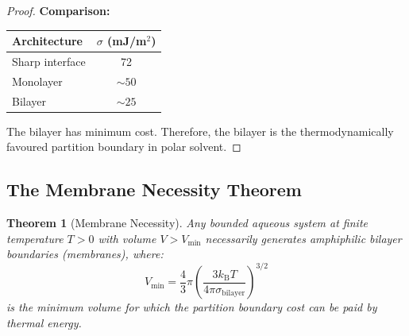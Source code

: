 \documentclass[twocolumn,10pt]{article}
\newtheorem{theorem}{Theorem}[section]
\theoremstyle{remark}
\newcommand{\kB}{k_{\mathrm{B}}}
\begin{document}
\begin{proof}
\textbf{Comparison:}
\begin{center}
\begin{tabular}{lc}
\toprule
Architecture & $\sigma$ (mJ/m$^2$) \\
\midrule
Sharp interface & 72 \\
Monolayer & $\sim 50$ \\
Bilayer & $\sim 25$ \\
\bottomrule
\end{tabular}
\end{center}

The bilayer has minimum cost. Therefore, the bilayer is the thermodynamically favoured partition boundary in polar solvent.
\end{proof}

\subsection{The Membrane Necessity Theorem}

\begin{theorem}[Membrane Necessity]
\label{thm:membrane_necessity}
Any bounded aqueous system at finite temperature $T > 0$ with volume $V > V_{\min}$ necessarily generates amphiphilic bilayer boundaries (membranes), where:
\begin{equation}
    V_{\min} = \frac{4}{3}\pi\left(\frac{3\kB T}{4\pi\sigma_{\text{bilayer}}}\right)^{3/2}
\end{equation}
is the minimum volume for which the partition boundary cost can be paid by thermal energy.
\end{theorem}
\end{document}
